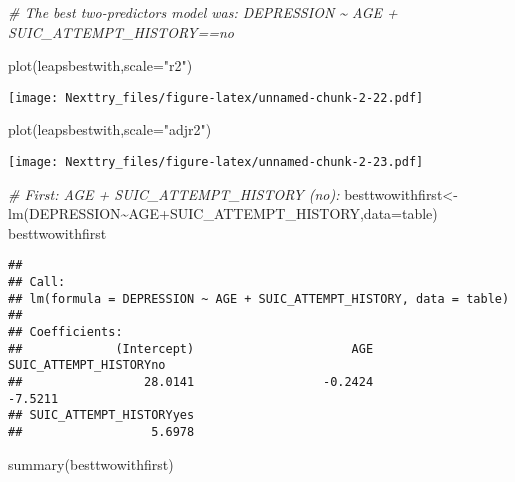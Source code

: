 \documentclass[
]{book}
\newenvironment{Shaded}{\begin{snugshade}}{\end{snugshade}}
\newcommand{\AttributeTok}[1]{\textcolor[rgb]{0.77,0.63,0.00}{#1}}
\newcommand{\CommentTok}[1]{\textcolor[rgb]{0.56,0.35,0.01}{\textit{#1}}}
\newcommand{\FunctionTok}[1]{\textcolor[rgb]{0.00,0.00,0.00}{#1}}
\newcommand{\NormalTok}[1]{#1}
\newcommand{\OtherTok}[1]{\textcolor[rgb]{0.56,0.35,0.01}{#1}}
\newcommand{\SpecialCharTok}[1]{\textcolor[rgb]{0.00,0.00,0.00}{#1}}
\newcommand{\StringTok}[1]{\textcolor[rgb]{0.31,0.60,0.02}{#1}}
\begin{document}
\begin{Shaded}
\begin{Highlighting}[]
\CommentTok{\# The best two{-}predictors model was: DEPRESSION \textasciitilde{} AGE + SUIC\_ATTEMPT\_HISTORY==no}

\FunctionTok{plot}\NormalTok{(leapsbestwith,}\AttributeTok{scale=}\StringTok{"r2"}\NormalTok{)}
\end{Highlighting}
\end{Shaded}

\texttt{[image: Nexttry\_files/figure-latex/unnamed-chunk-2-22.pdf]}

\begin{Shaded}
\begin{Highlighting}[]
\FunctionTok{plot}\NormalTok{(leapsbestwith,}\AttributeTok{scale=}\StringTok{"adjr2"}\NormalTok{)}
\end{Highlighting}
\end{Shaded}

\texttt{[image: Nexttry\_files/figure-latex/unnamed-chunk-2-23.pdf]}

\begin{Shaded}
\begin{Highlighting}[]
\CommentTok{\# First: AGE + SUIC\_ATTEMPT\_HISTORY (no):}
\NormalTok{besttwowithfirst}\OtherTok{\textless{}{-}}\FunctionTok{lm}\NormalTok{(DEPRESSION}\SpecialCharTok{\textasciitilde{}}\NormalTok{AGE}\SpecialCharTok{+}\NormalTok{SUIC\_ATTEMPT\_HISTORY,}\AttributeTok{data=}\NormalTok{table)}
\NormalTok{besttwowithfirst}
\end{Highlighting}
\end{Shaded}

\begin{verbatim}
## 
## Call:
## lm(formula = DEPRESSION ~ AGE + SUIC_ATTEMPT_HISTORY, data = table)
## 
## Coefficients:
##             (Intercept)                      AGE   SUIC_ATTEMPT_HISTORYno  
##                 28.0141                  -0.2424                  -7.5211  
## SUIC_ATTEMPT_HISTORYyes  
##                  5.6978
\end{verbatim}

\begin{Shaded}
\begin{Highlighting}[]
\FunctionTok{summary}\NormalTok{(besttwowithfirst)}
\end{Highlighting}
\end{Shaded}
\end{document}
